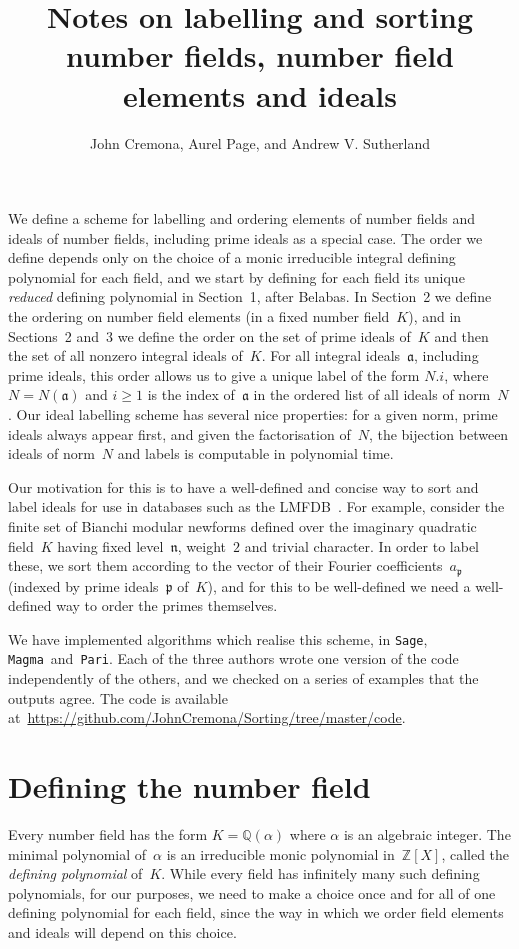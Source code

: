 \documentclass{article}
\title{Notes on labelling and sorting number fields, number field
  elements and ideals}
\author{John Cremona, Aurel Page, and Andrew V. Sutherland}
\def\Sage{{\tt Sage}}
\def\Magma{{\tt Magma}}
\def\Pari{{\tt Pari}}
\def\Z{{\mathbb Z}}
\def\Q{{\mathbb Q}}
\def\a{{\mathfrak a}}
\def\p{{\mathfrak p}}
\def\n{{\mathfrak n}}
\begin{document}
\maketitle

We define a scheme for labelling and ordering elements of number
fields and ideals of number fields, including prime ideals as a
special case.  The order we define depends only on the choice of a
monic irreducible integral defining polynomial for each field, and we
start by defining for each field its unique \emph{reduced} defining
polynomial in Section~1, after Belabas.  In Section~2 we define the ordering on
number field elements (in a fixed number field~$K$), and in Sections~2
and~3 we define the order on the set of prime ideals of~$K$ and then
the set of all nonzero integral ideals of~$K$.  For all integral
ideals~$\a$, including prime ideals, this order allows us to give a
unique label of the form $N.i$, where~$N=N(\a)$ and $i\ge1$ is the
index of~$\a$ in the ordered list of all ideals of norm~$N$.
Our ideal labelling scheme has several nice properties: for a given norm, prime
ideals always appear first, and given the factorisation of~$N$, the bijection
between ideals of norm~$N$ and labels is computable in polynomial time.

Our motivation for this is to have a well-defined and concise way to
sort and label ideals for use in databases such as the
LMFDB~\cite{lmfdb}.  For example, consider the finite set of Bianchi
modular newforms defined over the imaginary quadratic field~$K$ having
fixed level~$\n$, weight~$2$ and trivial character.  In order to label
these, we sort them according to the vector of their Fourier
coefficients~$a_{\p}$ (indexed by prime ideals~$\p$ of~$K$), and for
this to be well-defined we need a well-defined way to order the primes
themselves.

We have implemented algorithms which realise this scheme, in \Sage,
\Magma\ and~\Pari. Each of the three authors wrote one version of the code
independently of the others, and we checked on a series of examples that the
outputs agree. The code is available
at~\url{https://github.com/JohnCremona/Sorting/tree/master/code}.

\section{Defining the number field}
Every number field has the form $K=\Q(\alpha)$ where $\alpha$ is an
algebraic integer.  The minimal polynomial of~$\alpha$ is an
irreducible monic polynomial in~$\Z[X]$, called the \emph{defining
  polynomial} of~$K$.  While every field has infinitely many such
defining polynomials, for our purposes, we need to make a choice once
and for all of one defining polynomial for each field, since the way
in which we order field elements and ideals will depend on this
choice.
\end{document}
